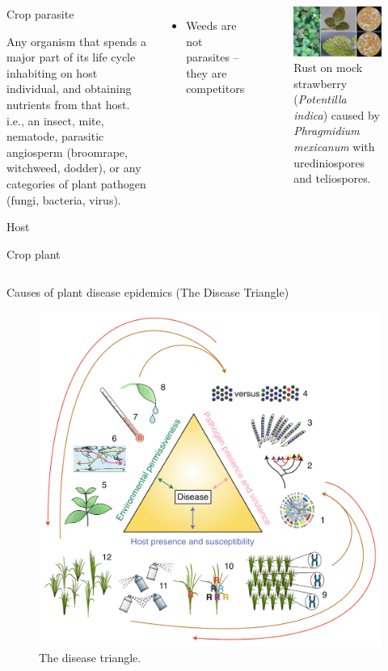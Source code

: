 \documentclass[11pt,dvipsnames,ignorenonframetext,aspectratio=169]{beamer}
\providecommand{\tightlist}{%
  \setlength{\itemsep}{0pt}\setlength{\parskip}{0pt}}
\newcommand{\bcolumns}{\begin{columns}[T, onlytextwidth]}
\newcommand{\ecolumns}{\end{columns}}
\newcommand{\bdescription}{\begin{description}}
\newcommand{\edescription}{\end{description}}
\begin{document}
\begin{frame}{}
\protect\hypertarget{section-5}{}
\bcolumns
{}
\bdescription
\footnotesize
\item[Crop parasite]

Any organism that spends a major part of its life cycle inhabiting on
host individual, and obtaining nutrients from that host. i.e., an
insect, mite, nematode, parasitic angiosperm (broomrape, witchweed,
dodder), or any categories of plant pathogen (fungi, bacteria, virus).

\item[Host]

Crop plant \edescription

\begin{itemize}
\tightlist
\item
  Weeds are not parasites -- they are competitors
\end{itemize}


\begin{figure}
\includegraphics[width=0.92\linewidth]{../images/FCpHrYNWEAIhiv9} \caption{Rust on mock strawberry (\textit{Potentilla indica}) caused by \textit{Phragmidium mexicanum} with urediniospores and teliospores.}\label{fig:strawberry-rust}
\end{figure}

\ecolumns
\end{frame}

\begin{frame}{Causes of plant disease epidemics (The Disease Triangle)}
\protect\hypertarget{causes-of-plant-disease-epidemics-the-disease-triangle}{}
\begin{figure}
\includegraphics[width=0.45\linewidth]{../images/disease_triangle} \caption{The disease triangle.}\label{fig:disease-triangle}
\end{figure}
\end{frame}
\end{document}
